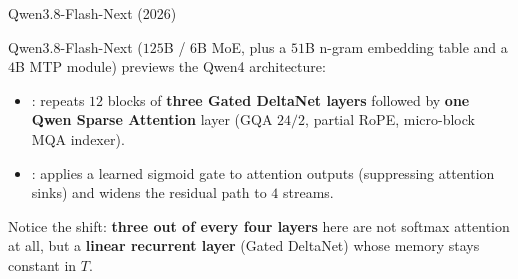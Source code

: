 \documentclass[11pt,aspectratio=169]{beamer}
\begin{document}
\begin{frame}{Qwen3.8-Flash-Next (2026)}
    \setlength{\parskip}{5pt}

    Qwen3.8-Flash-Next ($125$B / $6$B MoE, plus a $51$B n-gram embedding table
    and a $4$B MTP module) previews the Qwen4 architecture:
    \begin{itemize}
        \setlength{\itemsep}{3pt}
        \item {}: repeats $12$
              blocks of \textbf{three Gated DeltaNet layers} followed by
              \textbf{one Qwen Sparse Attention} layer (GQA $24/2$, partial
              RoPE, micro-block MQA indexer).
        \item {}: applies a
              learned sigmoid gate to attention outputs (suppressing attention
              sinks) and widens the residual path to $4$ streams.
    \end{itemize}

    \begin{tcolorbox}[nndsblue,boxsep=1mm,top=1.5mm,bottom=1.5mm]
        Notice the shift: \textbf{three out of every four layers} here are not
        softmax attention at all, but a \textbf{linear recurrent layer}
        (Gated DeltaNet) whose memory stays constant in $T$.
    \end{tcolorbox}


\end{frame}
\end{document}
